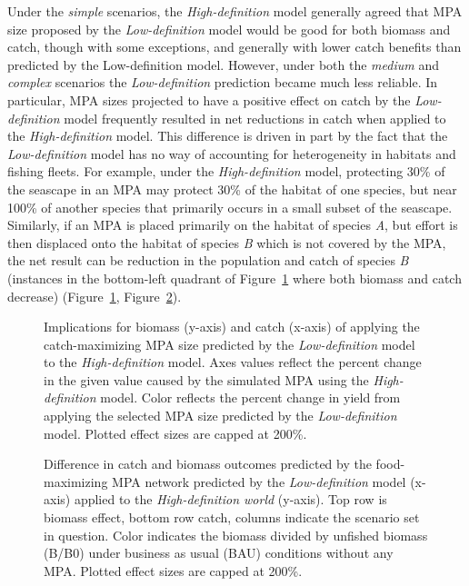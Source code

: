 \documentclass[
  default,
  lineno,
  referee]{sn-jnl}
\begin{document}
Under the \emph{simple} scenarios, the \emph{High-definition} model
generally agreed that MPA size proposed by the \emph{Low-definition}
model would be good for both biomass and catch, though with some
exceptions, and generally with lower catch benefits than predicted by
the Low-definition model. However, under both the \emph{medium} and
\emph{complex} scenarios the \emph{Low-definition} prediction became
much less reliable. In particular, MPA sizes projected to have a
positive effect on catch by the \emph{Low-definition} model frequently
resulted in net reductions in catch when applied to the
\emph{High-definition} model. This difference is driven in part by the
fact that the \emph{Low-definition} model has no way of accounting for
heterogeneity in habitats and fishing fleets. For example, under the
\emph{High-definition} model, protecting 30\% of the seascape in an MPA
may protect 30\% of the habitat of one species, but near 100\% of
another species that primarily occurs in a small subset of the seascape.
Similarly, if an MPA is placed primarily on the habitat of species
\emph{A}, but effort is then displaced onto the habitat of species
\emph{B} which is not covered by the MPA, the net result can be
reduction in the population and catch of species \emph{B} (instances in
the bottom-left quadrant of Figure~\ref{fig-imps} where both biomass and
catch decrease) (Figure~\ref{fig-imps}, Figure~\ref{fig-imps2}).

\begin{figure}


\caption{\label{fig-imps}Implications for biomass (y-axis) and catch
(x-axis) of applying the catch-maximizing MPA size predicted by the
\emph{Low-definition} model to the \emph{High-definition} model. Axes
values reflect the percent change in the given value caused by the
simulated MPA using the \emph{High-definition} model. Color reflects the
percent change in yield from applying the selected MPA size predicted by
the \emph{Low-definition} model. Plotted effect sizes are capped at
200\%.}

\end{figure}%

\begin{figure}


\caption{\label{fig-imps2}Difference in catch and biomass outcomes
predicted by the food-maximizing MPA network predicted by the
\emph{Low-definition} model (x-axis) applied to the
\emph{High-definition world} (y-axis). Top row is biomass effect, bottom
row catch, columns indicate the scenario set in question. Color
indicates the biomass divided by unfished biomass (B/B0) under business
as usual (BAU) conditions without any MPA. Plotted effect sizes are
capped at 200\%.}

\end{figure}%
\end{document}
